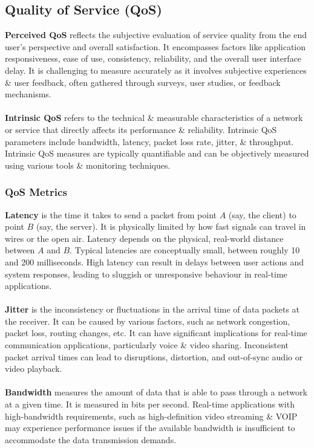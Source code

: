 \documentclass[a4paper,11pt]{article}
\begin{document}
\subsection{Quality of Service (QoS)}
\textbf{Perceived QoS} reflects the subjective evaluation of service quality from the end user's perspective and overall satisfaction.
It encompasses factors like application responsiveness, ease of use, consistency, reliability, and the overall user interface delay.
It is challenging to measure accurately as it involves subjective experiences \& user feedback, often gathered through surveys, user studies, or feedback mechanisms.
\\\\
\textbf{Intrinsic QoS} refers to the technical \& measurable characteristics of a network or service that directly affects its performance \& reliability.
Intrinsic QoS parameters include bandwidth, latency, packet loss rate, jitter, \& throughput.
Intrinsic QoS measures are typically quantifiable and can be objectively measured using various tools \& monitoring techniques.

\subsubsection{QoS Metrics}
\textbf{Latency} is the time it takes to send a packet from point $A$ (say, the client) to point $B$ (say, the server).
It is physically limited by how fast signals can travel in wires or the open air.
Latency depends on the physical, real-world distance between $A$ and $B$.
Typical latencies are conceptually small, between roughly 10 and 200 milliseconds.
High latency can result in delays between user actions and system responses, leading to sluggish or unresponsive behaviour in real-time applications.
\\\\
\textbf{Jitter} is the inconsistency or fluctuations in the arrival time of data packets at the receiver.
It can be caused by various factors, such as network congestion, packet loss, routing changes, etc.
It can have significant implications for real-time communication applications, particularly voice \& video sharing.
Inconsistent packet arrival times can lead to disruptions, distortion, and out-of-sync audio or video playback.
\\\\
\textbf{Bandwidth} measures the amount of data that is able to pass through a network at a given time.
It is measured in bits per second.
Real-time applications with high-bandwidth requirements, such as high-definition video streaming \& VOIP may experience performance issues if the available bandwidth is insufficient to accommodate the data transmission demands.
\end{document}

